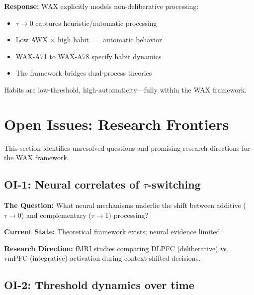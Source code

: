 \textbf{Response:} WAX explicitly models non-deliberative processing:
\begin{itemize}[nosep]
    \item $\tau \to 0$ captures heuristic/automatic processing
    \item Low AWX $\times$ high habit $=$ automatic behavior
    \item WAX-A71 to WAX-A78 specify habit dynamics
    \item The framework bridges dual-process theories
\end{itemize}
Habits are low-threshold, high-automaticity---fully within the WAX framework.


\section{Open Issues: Research Frontiers}
\label{sec:av-open-issues}

This section identifies unresolved questions and promising research directions for the WAX framework.

\subsection{OI-1: Neural correlates of $\tau$-switching}

\textbf{The Question:} What neural mechanisms underlie the shift between additive ($\tau \to 0$) and complementary ($\tau \to 1$) processing?

\textbf{Current State:} Theoretical framework exists; neural evidence limited.

\textbf{Research Direction:} fMRI studies comparing DLPFC (deliberative) vs. vmPFC (integrative) activation during context-shifted decisions.

\subsection{OI-2: Threshold dynamics over time}

